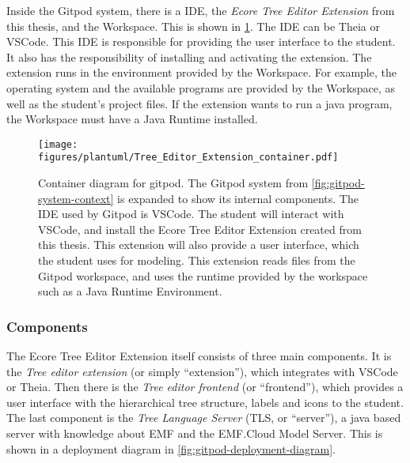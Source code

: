 Inside the \gls{Gitpod} system, there is a \acrshort{IDE}, the \textit{Ecore Tree Editor Extension} from this thesis, and the Workspace.
This is shown in \cref{fig:gitpod-container-diagram}.
The \acrshort{IDE} can be \gls{Theia} or \gls{VSCode}.
This \acrshort{IDE} is responsible for providing the user interface to the student.
It also has the responsibility of installing and activating the extension.
The extension runs in the environment provided by the Workspace.
For example, the operating system and the available programs are provided by the Workspace, as well as the student's project files.
If the extension wants to run a java program, the Workspace must have a Java Runtime installed.

\begin{figure}[H]  %
  \centering
  \texttt{[image: figures/plantuml/Tree\_Editor\_Extension\_container.pdf]}
  \caption[Gitpod container diagram]{Container diagram for gitpod. The Gitpod system from \cref{fig:gitpod-system-context} is expanded to show its internal components. The \acrshort{IDE} used by Gitpod is \gls{VSCode}.
  The student will interact with VSCode, and install the Ecore Tree Editor Extension created from this thesis.
  This extension will also provide a user interface, which the student uses for modeling.
  This extension reads files from the Gitpod workspace, and uses the runtime provided by the workspace such as a Java Runtime Environment.}\label{fig:gitpod-container-diagram}
\end{figure}


\subsubsection{Components}

The Ecore Tree Editor Extension itself consists of three main components.
It is the \textit{Tree editor extension} (or simply ``extension''), which integrates with \gls{VSCode} or \gls{Theia}.
Then there is the \textit{Tree editor frontend} (or ``frontend''), which provides a user interface with the hierarchical tree structure, labels and icons to the student.
The last component is the \textit{Tree Language Server} (TLS, or ``server''), a java based server with knowledge about \acrshort{EMF} and the EMF.Cloud Model Server.
This is shown in a deployment diagram in \cref{fig:gitpod-deployment-diagram}.\\


